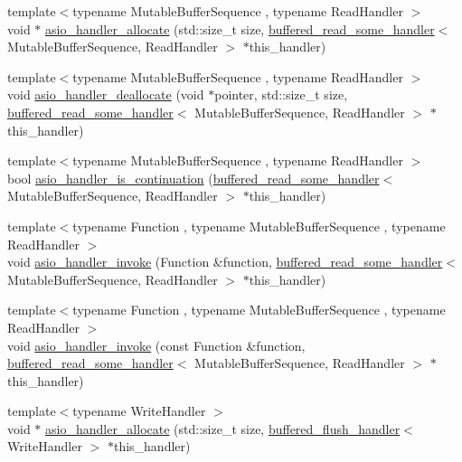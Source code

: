 \begin{DoxyCompactItemize}
{\footnotesize template$<$typename Mutable\+Buffer\+Sequence , typename Read\+Handler $>$ }\\void $\ast$ \hyperlink{namespaceasio_1_1detail_a3f804fdc5a405915ac5890c1dc68e4be}{asio\+\_\+handler\+\_\+allocate} (std\+::size\+\_\+t size, \hyperlink{classasio_1_1detail_1_1buffered__read__some__handler}{buffered\+\_\+read\+\_\+some\+\_\+handler}$<$ Mutable\+Buffer\+Sequence, Read\+Handler $>$ $\ast$this\+\_\+handler)
\item 
{\footnotesize template$<$typename Mutable\+Buffer\+Sequence , typename Read\+Handler $>$ }\\void \hyperlink{namespaceasio_1_1detail_a7c947f71fa1b43a5bc9319f0bd1c1418}{asio\+\_\+handler\+\_\+deallocate} (void $\ast$pointer, std\+::size\+\_\+t size, \hyperlink{classasio_1_1detail_1_1buffered__read__some__handler}{buffered\+\_\+read\+\_\+some\+\_\+handler}$<$ Mutable\+Buffer\+Sequence, Read\+Handler $>$ $\ast$this\+\_\+handler)
\item 
{\footnotesize template$<$typename Mutable\+Buffer\+Sequence , typename Read\+Handler $>$ }\\bool \hyperlink{namespaceasio_1_1detail_ac44a7a428f3c352ca36c3717f636447a}{asio\+\_\+handler\+\_\+is\+\_\+continuation} (\hyperlink{classasio_1_1detail_1_1buffered__read__some__handler}{buffered\+\_\+read\+\_\+some\+\_\+handler}$<$ Mutable\+Buffer\+Sequence, Read\+Handler $>$ $\ast$this\+\_\+handler)
\item 
{\footnotesize template$<$typename Function , typename Mutable\+Buffer\+Sequence , typename Read\+Handler $>$ }\\void \hyperlink{namespaceasio_1_1detail_ae073cb078bfe954de2a5ebdf05394d11}{asio\+\_\+handler\+\_\+invoke} (Function \&function, \hyperlink{classasio_1_1detail_1_1buffered__read__some__handler}{buffered\+\_\+read\+\_\+some\+\_\+handler}$<$ Mutable\+Buffer\+Sequence, Read\+Handler $>$ $\ast$this\+\_\+handler)
\item 
{\footnotesize template$<$typename Function , typename Mutable\+Buffer\+Sequence , typename Read\+Handler $>$ }\\void \hyperlink{namespaceasio_1_1detail_a6efdc7f7d778bf300d4df16b83dcb253}{asio\+\_\+handler\+\_\+invoke} (const Function \&function, \hyperlink{classasio_1_1detail_1_1buffered__read__some__handler}{buffered\+\_\+read\+\_\+some\+\_\+handler}$<$ Mutable\+Buffer\+Sequence, Read\+Handler $>$ $\ast$this\+\_\+handler)
\item 
{\footnotesize template$<$typename Write\+Handler $>$ }\\void $\ast$ \hyperlink{namespaceasio_1_1detail_afd7522834322aa05c109d9dead6e83f3}{asio\+\_\+handler\+\_\+allocate} (std\+::size\+\_\+t size, \hyperlink{classasio_1_1detail_1_1buffered__flush__handler}{buffered\+\_\+flush\+\_\+handler}$<$ Write\+Handler $>$ $\ast$this\+\_\+handler)

\end{DoxyCompactItemize}
